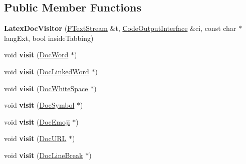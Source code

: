 \subsection*{Public Member Functions}
\begin{DoxyCompactItemize}
\item 
\mbox{\label{class_latex_doc_visitor_afc4b19f7484e39c08e3f9ba79006105a}} 
{\bfseries Latex\+Doc\+Visitor} (\mbox{\hyperlink{class_f_text_stream}{F\+Text\+Stream}} \&t, \mbox{\hyperlink{class_code_output_interface}{Code\+Output\+Interface}} \&ci, const char $\ast$lang\+Ext, bool inside\+Tabbing)
\item 
\mbox{\label{class_latex_doc_visitor_a8ae2ff00d6dce705978a4bda7e6109de}} 
void {\bfseries visit} (\mbox{\hyperlink{class_doc_word}{Doc\+Word}} $\ast$)
\item 
\mbox{\label{class_latex_doc_visitor_a6d1abce8a75d42e1c5cb14cec47e3711}} 
void {\bfseries visit} (\mbox{\hyperlink{class_doc_linked_word}{Doc\+Linked\+Word}} $\ast$)
\item 
\mbox{\label{class_latex_doc_visitor_a31c6a9d0f4f94e860238b2e44d264173}} 
void {\bfseries visit} (\mbox{\hyperlink{class_doc_white_space}{Doc\+White\+Space}} $\ast$)
\item 
\mbox{\label{class_latex_doc_visitor_ae8806f2aa531788b324aa6a846b88b34}} 
void {\bfseries visit} (\mbox{\hyperlink{class_doc_symbol}{Doc\+Symbol}} $\ast$)
\item 
\mbox{\label{class_latex_doc_visitor_a153d02794dbc5b2981f6d624f1336a3b}} 
void {\bfseries visit} (\mbox{\hyperlink{class_doc_emoji}{Doc\+Emoji}} $\ast$)
\item 
\mbox{\label{class_latex_doc_visitor_ae326ab64b1ec7bdefc733652e6d9dda9}} 
void {\bfseries visit} (\mbox{\hyperlink{class_doc_u_r_l}{Doc\+U\+RL}} $\ast$)
\item 
\mbox{\label{class_latex_doc_visitor_af4796eef0409def57b7d4ab3fee409b7}} 
void {\bfseries visit} (\mbox{\hyperlink{class_doc_line_break}{Doc\+Line\+Break}} $\ast$)

\end{DoxyCompactItemize}
